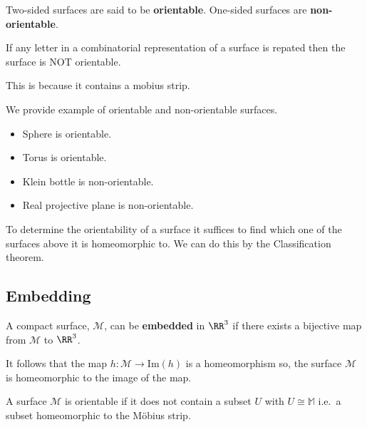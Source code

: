 \documentclass[12pt, a4paper]{article}
\begin{document}
\begin{definition}
    Two-sided surfaces are said to be \textbf{orientable}. One-sided surfaces are \textbf{non-orientable}. 
\end{definition}

\begin{mdthm}
    If any letter in a combinatorial representation of a surface is repated then the surface is NOT orientable. 
\end{mdthm}

\begin{mdnote}
    This is because it contains a mobius strip.
\end{mdnote}

\begin{mdexample}
    We provide example of orientable and non-orientable surfaces.
    \begin{itemize}
        \item Sphere is orientable.
        \item Torus is orientable.
        \item Klein bottle is non-orientable.
        \item Real projective plane is non-orientable.
    \end{itemize}
\end{mdexample}

\begin{mdnote}
    To determine the orientability of a surface it suffices to find which one of the surfaces above it is homeomorphic to. We can do this by the Classification theorem.
\end{mdnote}

\subsection{Embedding}

\begin{definition}
    A compact surface, \(\mathcal{M}\), can be \textbf{embedded} in \(\RR^3\) if there exists a bijective map from \(\mathcal{M}\) to \(\RR^3\).
\end{definition}

\begin{mdremark}
    It follows that the map \(h: \mathcal{M} \to \text{Im}(h)\) is  a homeomorphism so, the surface \(\mathcal{M}\) is homeomorphic to the image of the map.
\end{mdremark}

\begin{definition}
    A surface \(\mathcal{M}\) is orientable if it does not contain a subset \(U\) with \(U \cong \mathbb{M}\) i.e.\ a subset homeomorphic to the Möbius strip.
\end{definition}
\end{document}
